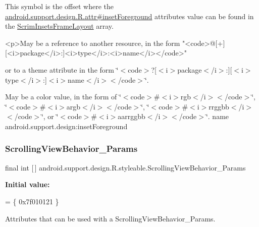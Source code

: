 This symbol is the offset where the \hyperlink{classandroid_1_1support_1_1design_1_1R_1_1attr_aab326e4395fb0655ef08dc1f6502462b}{android.\+support.\+design.\+R.\+attr\#inset\+Foreground} attribute\textquotesingle{}s value can be found in the \hyperlink{classandroid_1_1support_1_1design_1_1R_1_1styleable_a95b90e25d1cb72b4321bb1e78f92f75b}{Scrim\+Insets\+Frame\+Layout} array.

\begin{DoxyVerb}      <p>May be a reference to another resource, in the form "<code>@[+][<i>package</i>:]<i>type</i>:<i>name</i></code>"
\end{DoxyVerb}
 or to a theme attribute in the form \char`\"{}$<$code$>$?\mbox{[}$<$i$>$package$<$/i$>$\+:\mbox{]}\mbox{[}$<$i$>$type$<$/i$>$\+:\mbox{]}$<$i$>$name$<$/i$>$$<$/code$>$\char`\"{}. 

May be a color value, in the form of \char`\"{}$<$code$>$\#$<$i$>$rgb$<$/i$>$$<$/code$>$\char`\"{}, \char`\"{}$<$code$>$\#$<$i$>$argb$<$/i$>$$<$/code$>$\char`\"{}, \char`\"{}$<$code$>$\#$<$i$>$rrggbb$<$/i$>$$<$/code$>$\char`\"{}, or \char`\"{}$<$code$>$\#$<$i$>$aarrggbb$<$/i$>$$<$/code$>$\char`\"{}.  name android.\+support.\+design\+:inset\+Foreground \mbox{\label{classandroid_1_1support_1_1design_1_1R_1_1styleable_a89ee309ee8c19c6a7c6343663ef077b9}} 
\subsubsection{\texorpdfstring{Scrolling\+View\+Behavior\+\_\+\+Params}{ScrollingViewBehavior\_Params}}
{\footnotesize\ttfamily final int \mbox{[}$\,$\mbox{]} android.\+support.\+design.\+R.\+styleable.\+Scrolling\+View\+Behavior\+\_\+\+Params\hspace{0.3cm}{\ttfamily [static]}}

{\bfseries Initial value\+:}
\begin{DoxyCode}
= \{
            0x7f010121
        \}
\end{DoxyCode}
Attributes that can be used with a Scrolling\+View\+Behavior\+\_\+\+Params. 

